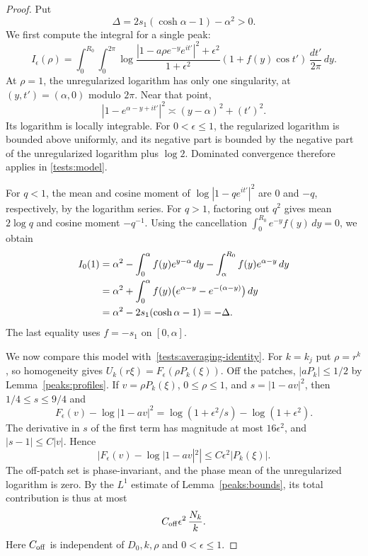 \begin{proof}
Put
\[
 \Delta=2s_1(\cosh\alpha-1)-\alpha^2>0.
\]
We first compute the integral for a single peak:
\begin{equation}\label{tests:model}
 I_\epsilon(\rho)=
 \int_0^{R_0}\int_0^{2\pi}
 \log\frac{|1-a\rho e^{-y}e^{it'}|^2+\epsilon^2}
               {1+\epsilon^2}
 (1+f(y)\cos t')\,\frac{dt'}{2\pi}\,dy.
\end{equation}
At $\rho=1$, the unregularized logarithm has only one singularity,
at $(y,t')=(\alpha,0)$ modulo $2\pi$.  Near that point,
\[
 |1-e^{\alpha-y+it'}|^2
 \asymp (y-\alpha)^2+(t')^2.
\]
Its logarithm is locally integrable.  For $0<\epsilon\le1$, the
regularized logarithm is bounded above uniformly, and its negative
part is bounded by the negative part of the unregularized logarithm
plus $\log2$.  Dominated convergence therefore applies in
\eqref{tests:model}.

For $q<1$, the mean and cosine moment of
$\log|1-qe^{it'}|^2$ are $0$ and $-q$, respectively, by the logarithm
series.  For $q>1$, factoring out $q^2$ gives mean $2\log q$ and
cosine moment $-q^{-1}$.  Using the cancellation
$\int_0^{R_0}e^{-y}f(y)\,dy=0$, we obtain
\begin{align}
 I_0(1)
 &=\alpha^2-\int_0^\alpha f(y)e^{y-\alpha}\,dy
             -\int_\alpha^{R_0}f(y)e^{\alpha-y}\,dy \notag\\
 &=\alpha^2+\int_0^\alpha
       f(y)\bigl(e^{\alpha-y}-e^{-(\alpha-y)}\bigr)\,dy \notag\\
 &=\alpha^2-2s_1(\cosh\alpha-1)=-\Delta.
 \label{tests:model-sign}
\end{align}
The last equality uses $f=-s_1$ on $[0,\alpha]$.

We now compare this model with~\eqref{tests:averaging-identity}.
For $k=k_j$ put $\rho=r^k$, so homogeneity gives
$U_k(r\xi)=F_\epsilon(\rho P_k(\xi))$.
Off the patches, $|aP_k|\le1/2$ by Lemma~\ref{peaks:profiles}.
If $v=\rho P_k(\xi)$, $0\le\rho\le1$, and $s=|1-av|^2$, then
$1/4\le s\le9/4$ and
\[
 F_\epsilon(v)-\log|1-av|^2
 =\log(1+\epsilon^2/s)-\log(1+\epsilon^2).
\]
The derivative in $s$ of the first term has magnitude at most
$16\epsilon^2$, and $|s-1|\le C|v|$.  Hence
\[
 |F_\epsilon(v)-\log|1-av|^2|
 \le C\epsilon^2|P_k(\xi)|.
\]
The off-patch set is phase-invariant, and the phase mean of the
unregularized logarithm is zero.  By the $L^1$ estimate of
Lemma~\ref{peaks:bounds}, its total contribution is thus at most
\begin{equation}\label{tests:off-patch}
 C_{\rm off}\epsilon^2\,\frac{N_k}{k}.
\end{equation}
Here $C_{\rm off}$ is independent of $D_0,k,\rho$ and
$0<\epsilon\le1$.


\end{proof}
